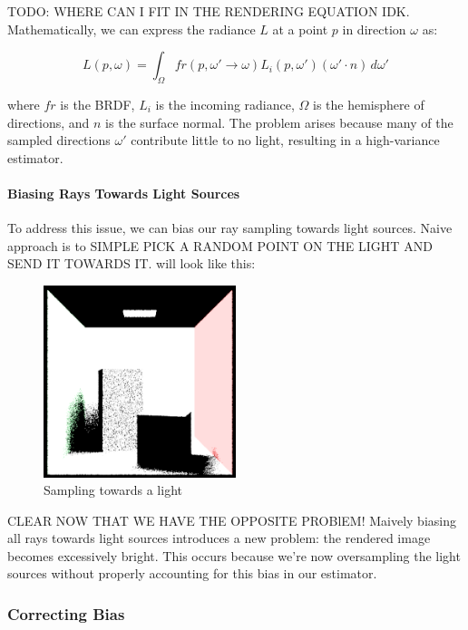\documentclass[12pt]{article}
\begin{document}
TODO: WHERE CAN I FIT IN THE RENDERING EQUATION IDK.
Mathematically, we can express the radiance \( L \) at a point \( p \) in direction \( \omega \) as:

\[
    L(p, \omega) = \int_{\Omega} fr(p, \omega' \to \omega) L_i(p, \omega') (\omega' \cdot n) \, d\omega'
\]

where \( fr \) is the BRDF, \( L_i \) is the incoming radiance, \( \Omega \) is the hemisphere of directions, and \( n \) is the surface normal. The problem arises because many of the sampled directions \( \omega' \) contribute little to no light, resulting in a high-variance estimator.

\paragraph{Biasing Rays Towards Light Sources}

To address this issue, we can bias our ray sampling towards light sources. Naive approach is to SIMPLE PICK A RANDOM POINT ON THE LIGHT AND SEND IT TOWARDS IT. will look like this:

\begin{figure}[H]
    \centering
    \includegraphics[width=0.5\textwidth]{images/one_samp/towards_light_no_pdf.png}
    \caption{Sampling towards a light}
    \label{fig:onesampimportancenopdf}
\end{figure}

CLEAR NOW THAT WE HAVE THE OPPOSITE PROBlEM! Maively biasing all rays towards light sources introduces a new problem: the rendered image becomes excessively bright. This occurs because we're now oversampling the light sources without properly accounting for this bias in our estimator.

\subsubsection{Correcting Bias}
\end{document}
